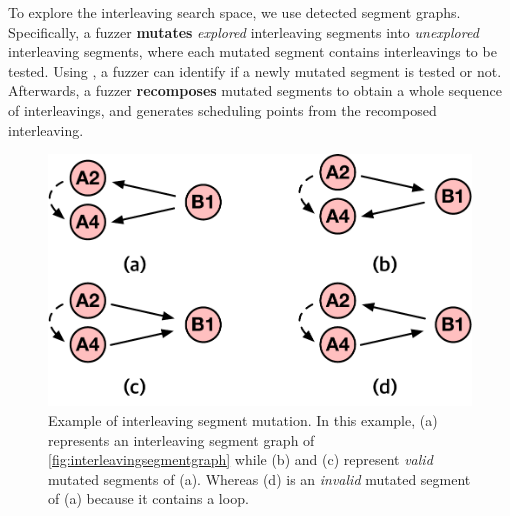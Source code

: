 To explore the interleaving search space, we use detected segment 
graphs.
%
Specifically, a fuzzer \textbf{mutates} \textit{explored} interleaving
segments into \textit{unexplored} interleaving segments, where each
mutated segment contains interleavings to be tested. 
Using \intcov, a fuzzer can identify if a newly mutated segment 
is tested or not.
%
Afterwards, a fuzzer \textbf{recomposes} mutated segments
to obtain a whole sequence of interleavings, and generates 
scheduling points from the recomposed interleaving.
%

%
%


\begin{figure}[t]
  \centering
  \includegraphics[width=0.7\linewidth]{fig/interleavingmutation.pdf}
  \caption{Example of interleaving segment mutation. In this example,
    (a) represents an interleaving segment graph of
    \autoref{fig:interleavingsegmentgraph} while (b) and (c) represent
    \textit{valid} mutated segments of (a). Whereas (d) is an
    \textit{invalid} mutated segment of (a) because it contains a
    loop.}
  \label{fig:interleavingmutation}
\end{figure}

